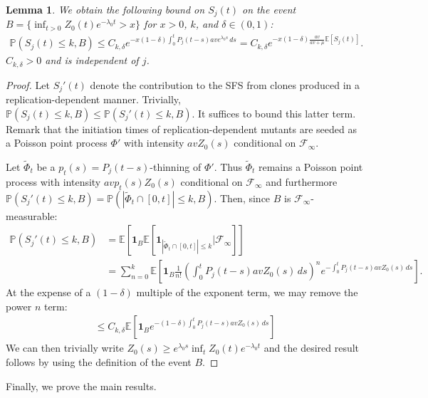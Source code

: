 \documentclass{article}
\numberwithin{equation}{section}
\newtheorem{lemma}{Lemma}
\begin{document}
\begin{lemma}\label{lem:upper_bound_Sj_strong}
    We obtain the following bound on $S_{j}(t)$ on the event $B=\{\inf_{t>0} Z_0(t)e^{-\lambda_0 t}>x\}$ for $x>0$, $k$, and $\delta\in (0,1)$:
    \begin{align}
        \mathbb{P}(S_j(t)\leq k,B)\leq C_{k,\delta}e^{-x(1-\delta)\int_0^t P_j(t-s)ave^{\lambda_0 s}\,ds}=C_{k,\delta}e^{-x(1-\delta)\frac{av}{av+\mu}\mathbb{E}[S_j(t)]}.\label{eq:S_j_upper_bound}
    \end{align}
    $C_{k,\delta}>0$ and is independent of $j$.
\end{lemma}
\begin{proof}
    Let $S_j'(t)$ denote the contribution to the SFS from clones produced in a replication-dependent manner. Trivially, $\mathbb{P}(S_j(t)\leq k,B)\leq \mathbb{P}(S_j'(t)\leq k,B)$. It suffices to bound this latter term. Remark that the initiation times of replication-dependent mutants are seeded as a Poisson point process $\Phi'$ with intensity $avZ_0(s)$ conditional on $\mathcal{F}_\infty$.

    Let $\widetilde{\Phi}_t$ be a $p_t(s)=P_j(t-s)$-thinning of $\Phi'$. Thus $\widetilde{\Phi}_t$ remains a Poisson point process with intensity $avp_t(s)Z_0(s)$ conditional on $\mathcal{F}_\infty$ and furthermore $\mathbb{P}(S_{j}'(t)\leq k,B)=\mathbb{P}(|\widetilde{\Phi}_t\cap [0,t]|\leq k,B)$. Then, since $B$ is $\mathcal{F}_\infty$-measurable:
    \begin{align*}
        \mathbb{P}(S_{j}'(t)\leq k,B)&=\mathbb{E}\left[\mathbf{1}_{B}\mathbb{E}[\mathbf{1}_{|\widetilde{\Phi}_t\cap [0,t]|\leq k}|\mathcal{F}_\infty]\right]\\
        &=\sum_{n=0}^k\mathbb{E}\left[\mathbf{1}_B\frac{1}{n!}\left(\int_0^t P_{j}(t-s)avZ_0(s)\,ds\right)^ne^{-\int_0^t P_{j}(t-s)avZ_0(s)\,ds}\right].
    \end{align*}
    At the expense of a $(1-\delta)$ multiple of the exponent term, we may remove the power $n$ term:
    \begin{align*}
        \leq C_{k,\delta}\mathbb{E}\left[\mathbf{1}_Be^{-(1-\delta)\int_0^t P_{j}(t-s)avZ_0(s)\,ds}\right]
    \end{align*}
    We can then trivially write $Z_0(s)\geq e^{\lambda_0 s}\inf_t Z_0(t)e^{-\lambda_0 t}$ and the desired result follows by using the definition of the event $B$.
\end{proof}

Finally, we prove the main results.
\end{document}
